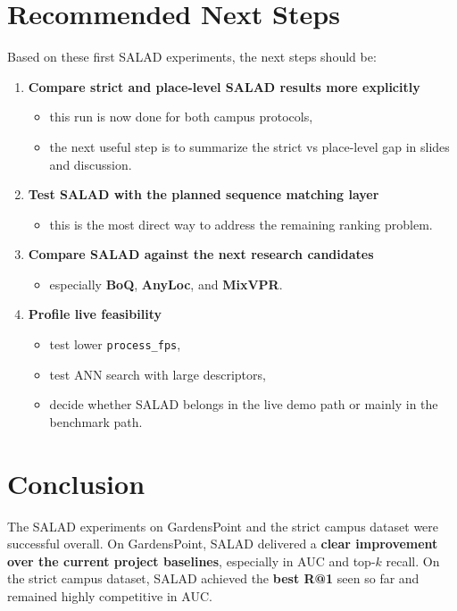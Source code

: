 \documentclass[11pt]{article}
\begin{document}
\section*{Recommended Next Steps}
Based on these first SALAD experiments, the next steps should be:
\begin{enumerate}[leftmargin=*]
  \item \textbf{Compare strict and place-level SALAD results more explicitly}
  \begin{itemize}[leftmargin=*]
    \item this run is now done for both campus protocols,
    \item the next useful step is to summarize the strict vs place-level gap in slides and discussion.
  \end{itemize}

  \item \textbf{Test SALAD with the planned sequence matching layer}
  \begin{itemize}[leftmargin=*]
    \item this is the most direct way to address the remaining ranking problem.
  \end{itemize}

  \item \textbf{Compare SALAD against the next research candidates}
  \begin{itemize}[leftmargin=*]
    \item especially \textbf{BoQ}, \textbf{AnyLoc}, and \textbf{MixVPR}.
  \end{itemize}

  \item \textbf{Profile live feasibility}
  \begin{itemize}[leftmargin=*]
    \item test lower \texttt{process\_fps},
    \item test ANN search with large descriptors,
    \item decide whether SALAD belongs in the live demo path or mainly in the benchmark path.
  \end{itemize}
\end{enumerate}

\section*{Conclusion}
The SALAD experiments on GardensPoint and the strict campus dataset were successful overall. On GardensPoint, SALAD delivered a \textbf{clear improvement over the current project baselines}, especially in AUC and top-$k$ recall. On the strict campus dataset, SALAD achieved the \textbf{best R@1} seen so far and remained highly competitive in AUC.
\end{document}
